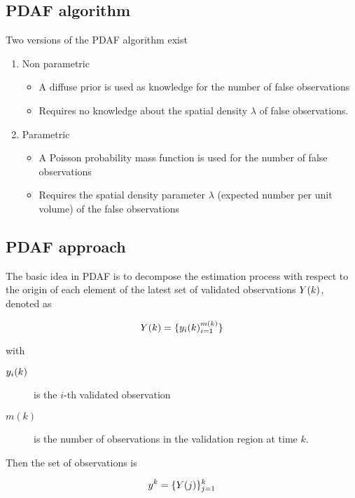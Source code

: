 \subsection{PDAF algorithm}

Two versions of the PDAF algorithm exist

\begin{enumerate}
	\item Non parametric
	\begin{itemize}
	\item A diffuse prior is used as knowledge for the number of false observations
	\item Requires no knowledge about the spatial density $\lambda$ of false observations.
	\end{itemize}
	\item Parametric
	

	\begin{itemize}
		\item A Poisson probability mass function is used for the number of false observations
		\item  Requires the spatial density parameter $\lambda$ (expected number per unit volume) of the false observations
	\end{itemize}
\end{enumerate}

\subsection{PDAF approach}
The basic idea in PDAF is to decompose the estimation process with respect to the origin of each element of the latest set of validated observations ${Y}(k)$, denoted as

\begin{equation}\label{key}
{Y}(k) = \{{y}_i(k)^{m(k)}_{i=1}\}
\end{equation}

with

\begin{description}
	\item[${y}_i(k)$] is the $i$-th validated observation
	\item[$ m(k) $] is the number of observations in the validation region at time $k$.
\end{description}

Then the set of observations is 

\begin{equation}\label{observSet}
	{y}^k = \{{Y}(j)\}^{k}_{j=1}
\end{equation}



